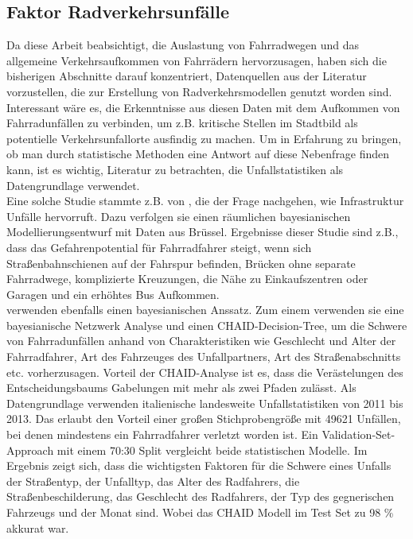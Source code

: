 \documentclass[a4paper,12pt]{thesis}
\begin{document}
\subsection{Faktor Radverkehrsunfälle}

Da diese Arbeit beabsichtigt, die Auslastung von Fahrradwegen und das allgemeine Verkehrsaufkommen von Fahrrädern hervorzusagen, haben sich die bisherigen Abschnitte darauf konzentriert, Datenquellen aus der Literatur vorzustellen, die zur Erstellung von Radverkehrsmodellen genutzt worden sind. Interessant wäre es, die Erkenntnisse aus diesen Daten mit dem Aufkommen von Fahrradunfällen zu verbinden, um z.B. kritische Stellen im Stadtbild als potentielle Verkehrsunfallorte ausfindig zu machen. Um in Erfahrung zu bringen, ob man durch statistische Methoden eine Antwort auf diese Nebenfrage finden kann, ist es wichtig, Literatur zu betrachten, die Unfallstatistiken als Datengrundlage verwendet.\\
Eine solche Studie stammte z.B. von \cite{Vandenbulcke2014}, die der Frage nachgehen, wie Infrastruktur Unfälle hervorruft. Dazu verfolgen sie einen räumlichen bayesianischen Modellierungsentwurf mit Daten aus Brüssel. Ergebnisse dieser Studie sind z.B., dass das Gefahrenpotential für Fahrradfahrer steigt, wenn sich Straßenbahnschienen auf der Fahrspur befinden, Brücken ohne separate Fahrradwege, komplizierte Kreuzungen, die Nähe zu Einkaufszentren oder Garagen und ein erhöhtes Bus Aufkommen.\\
\cite{PRATI201744} verwenden ebenfalls einen bayesianischen Anssatz. Zum einem verwenden sie eine bayesianische Netzwerk Analyse und einen CHAID-Decision-Tree, um die Schwere von Fahrradunfällen anhand von Charakteristiken wie Geschlecht und Alter der Fahrradfahrer, Art des Fahrzeuges des Unfallpartners, Art des Straßenabschnitts etc. vorherzusagen. Vorteil der CHAID-Analyse ist es, dass die Verästelungen des Entscheidungsbaums Gabelungen mit mehr als zwei Pfaden zulässt. Als Datengrundlage verwenden \cite{PRATI201744} italienische landesweite Unfallstatistiken von 2011 bis 2013. Das erlaubt den Vorteil einer großen Stichprobengröße mit 49621 Unfällen, bei denen mindestens ein Fahrradfahrer verletzt worden ist. Ein Validation-Set-Approach mit einem 70:30 Split vergleicht beide statistischen Modelle. Im Ergebnis zeigt sich, dass die wichtigsten Faktoren für die Schwere eines Unfalls der Straßentyp, der Unfalltyp, das Alter des Radfahrers, die Straßenbeschilderung, das Geschlecht des Radfahrers, der Typ des gegnerischen Fahrzeugs und der Monat sind. Wobei das CHAID Modell im Test Set zu 98 \% akkurat war.\\
\end{document}
